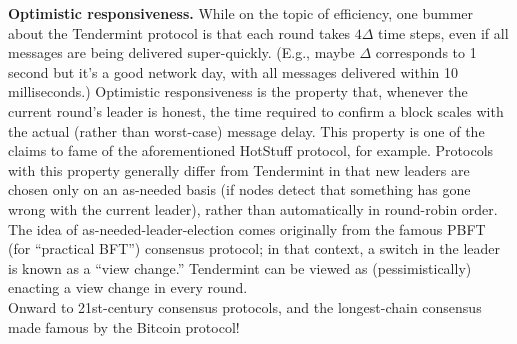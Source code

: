 \noindent
\textbf{Optimistic responsiveness.} 
While on the topic of efficiency, one bummer about the
Tendermint protocol is that each round takes $4\Delta$ time steps, even if all messages are being
delivered super-quickly. (E.g., maybe $\Delta$ corresponds to 1 second but it’s a good network
day, with all messages delivered within 10 milliseconds.) Optimistic responsiveness is the
property that, whenever the current round’s leader is honest, the time required to confirm a
block scales with the actual (rather than worst-case) message delay. This property is one
of the claims to fame of the aforementioned HotStuff protocol, for example. Protocols
with this property generally differ from Tendermint in that new leaders are chosen only on
an as-needed basis (if nodes detect that something has gone wrong with the current leader),
rather than automatically in round-robin order. The idea of as-needed-leader-election comes
originally from the famous PBFT (for “practical BFT”) consensus protocol; in that
context, a switch in the leader is known as a “view change.” Tendermint can be viewed as
(pessimistically) enacting a view change in every round.\\
Onward to 21st-century consensus protocols, and the longest-chain consensus made famous by the Bitcoin protocol!
